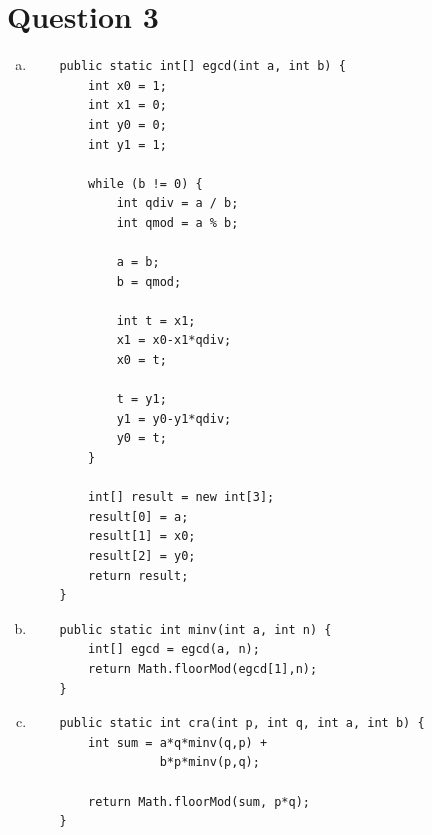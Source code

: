 \documentclass[journal,a4paper]{article}
\begin{document}
\section*{Question 3}
\begin{enumerate}[(a)]
	\item \begin{lstlisting}
	public static int[] egcd(int a, int b) {
		int x0 = 1;
		int x1 = 0;
		int y0 = 0;
		int y1 = 1;

		while (b != 0) {
			int qdiv = a / b;
			int qmod = a % b;

			a = b;
			b = qmod;

			int t = x1;
			x1 = x0-x1*qdiv;
			x0 = t;

			t = y1;
			y1 = y0-y1*qdiv;
			y0 = t;
		}

		int[] result = new int[3];
		result[0] = a;
		result[1] = x0;
		result[2] = y0;
		return result;
	}
	\end{lstlisting}

	\item \begin{lstlisting}
	public static int minv(int a, int n) {
		int[] egcd = egcd(a, n);
		return Math.floorMod(egcd[1],n);
	}
	\end{lstlisting}
	
	\item \begin{lstlisting}
	public static int cra(int p, int q, int a, int b) {
		int sum = a*q*minv(q,p) +
		  	      b*p*minv(p,q);

		return Math.floorMod(sum, p*q);
	}
	\end{lstlisting}
\end{enumerate}
\end{document}
